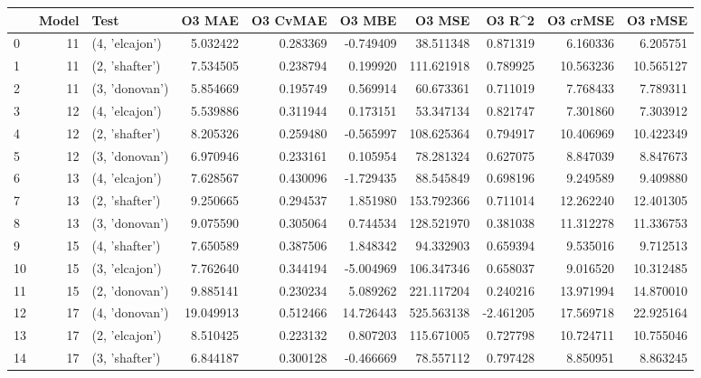 \begin{tabular}{lrlrrrrrrr}
\toprule
{} &  Model &            Test &     O3 MAE &  O3 CvMAE &     O3 MBE &      O3 MSE &    O3 R\textasciicircum2 &   O3 crMSE &    O3 rMSE \\
\midrule
0  &     11 &  (4, 'elcajon') &   5.032422 &  0.283369 &  -0.749409 &   38.511348 &  0.871319 &   6.160336 &   6.205751 \\
1  &     11 &  (2, 'shafter') &   7.534505 &  0.238794 &   0.199920 &  111.621918 &  0.789925 &  10.563236 &  10.565127 \\
2  &     11 &  (3, 'donovan') &   5.854669 &  0.195749 &   0.569914 &   60.673361 &  0.711019 &   7.768433 &   7.789311 \\
3  &     12 &  (4, 'elcajon') &   5.539886 &  0.311944 &   0.173151 &   53.347134 &  0.821747 &   7.301860 &   7.303912 \\
4  &     12 &  (2, 'shafter') &   8.205326 &  0.259480 &  -0.565997 &  108.625364 &  0.794917 &  10.406969 &  10.422349 \\
5  &     12 &  (3, 'donovan') &   6.970946 &  0.233161 &   0.105954 &   78.281324 &  0.627075 &   8.847039 &   8.847673 \\
6  &     13 &  (4, 'elcajon') &   7.628567 &  0.430096 &  -1.729435 &   88.545849 &  0.698196 &   9.249589 &   9.409880 \\
7  &     13 &  (2, 'shafter') &   9.250665 &  0.294537 &   1.851980 &  153.792366 &  0.711014 &  12.262240 &  12.401305 \\
8  &     13 &  (3, 'donovan') &   9.075590 &  0.305064 &   0.744534 &  128.521970 &  0.381038 &  11.312278 &  11.336753 \\
9  &     15 &  (4, 'shafter') &   7.650589 &  0.387506 &   1.848342 &   94.332903 &  0.659394 &   9.535016 &   9.712513 \\
10 &     15 &  (3, 'elcajon') &   7.762640 &  0.344194 &  -5.004969 &  106.347346 &  0.658037 &   9.016520 &  10.312485 \\
11 &     15 &  (2, 'donovan') &   9.885141 &  0.230234 &   5.089262 &  221.117204 &  0.240216 &  13.971994 &  14.870010 \\
12 &     17 &  (4, 'donovan') &  19.049913 &  0.512466 &  14.726443 &  525.563138 & -2.461205 &  17.569718 &  22.925164 \\
13 &     17 &  (2, 'elcajon') &   8.510425 &  0.223132 &   0.807203 &  115.671005 &  0.727798 &  10.724711 &  10.755046 \\
14 &     17 &  (3, 'shafter') &   6.844187 &  0.300128 &  -0.466669 &   78.557112 &  0.797428 &   8.850951 &   8.863245 \\

\end{tabular}
